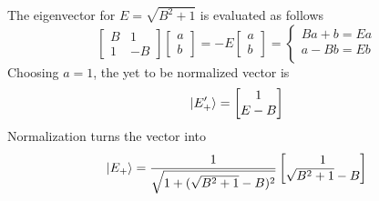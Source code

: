 \documentclass[../../../main.tex]{subfiles}
\begin{document}
The eigenvector for $E = \sqrt{B^2+1}$ is evaluated as follows
\begin{equation*}
    \begin{bmatrix}
        B & 1  \\
        1 & -B
    \end{bmatrix}
    \begin{bmatrix}
        a \\
        b
    \end{bmatrix}
    = -E
    \begin{bmatrix}
        a \\
        b
    \end{bmatrix}
    = \begin{cases}
        Ba+b=Ea\\
        a-Bb=Eb\\
    \end{cases}
\end{equation*}
Choosing $a=1$, the yet to be normalized vector is
\begin{equation*}
    \ket{E_+'} =
    \begin{bmatrix}
        1 \\ E-B
    \end{bmatrix}
\end{equation*}
Normalization turns the vector into
\begin{equation*}
    \ket{E_+} =
    \frac{1 }{\sqrt{1+(\sqrt{B^2+1}-B)^2}}
    \begin{bmatrix}
        1 \\ \sqrt{B^2+1}-B
    \end{bmatrix}
\end{equation*}
\end{document}
